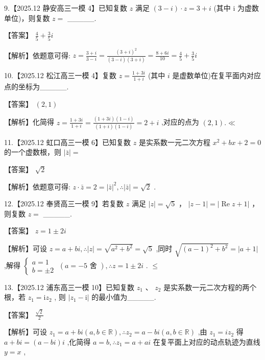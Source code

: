 \documentclass[10pt]{article}
\begin{document}
9.【2025.12 静安高三一模 4】已知复数 \(z\) 满足 \(\left( {3 - i}\right)  \cdot  z = 3 + i\) (其中 \(\mathrm{i}\) 为虚数单位)，则复数 \(z =\) \_\_\_\_\_.

【答案】 \(\frac{4}{5} + \frac{3}{5}i\)

【解析】依题意可得: \(z = \frac{3 + i}{3 - i} = \frac{{\left( 3 + i\right) }^{2}}{\left( {3 - i}\right) \left( {3 + i}\right) } = \frac{8 + {6i}}{10} = \frac{4}{5} + \frac{3}{5}i\)

10.【2025.12 松江高三一模 4】复数 \(z = \frac{1 + {3i}}{1 + i}\) (其中 \(i\) 是虚数单位)在复平面内对应点的坐标为\_\_\_\_\_.

【答案】 \(\left( {2,1}\right)\)

【解析】化简得 \(z = \frac{1 + {3i}}{1 + i} = \frac{\left( {1 + {3i}}\right) \left( {1 - i}\right) }{\left( {1 + i}\right) \left( {1 - i}\right) } = 2 + i\) ,对应的点为 \(\left( {2,1}\right) . \ll\)

11.【2025.12 虹口高三一模 6】已知复数 \(z\) 是实系数一元二次方程 \({x}^{2} + {bx} + 2 = 0\) 的一个虚数根，则 \(\left| \bar{z}\right|  =\)

【答案】 \(\sqrt{2}\)

【解析】依题意可得: \(z \cdot  \bar{z} = 2 = {\left| \bar{z}\right| }^{2},\therefore \left| \bar{z}\right|  = \sqrt{2}\) .

12.【2025.12 奉贤高三一模 9】若复数 \(z\) 满足 \(\left| z\right|  = \sqrt{5}\) ， \(\left| {z - 1}\right|  = \left| {\operatorname{Re}z + 1}\right|\) ，则复数 \(z =\) \_\_\_\_\_.

【答案】 \(z = 1 \pm  {2i}\)

【解析】可设 \(z = a + {bi},\therefore \left| z\right|  = \sqrt{{a}^{2} + {b}^{2}} = \sqrt{5}\) ,同时 \(\sqrt{{\left( a - 1\right) }^{2} + {b}^{2}} = \left| {a + 1}\right|\) ,解得 \(\left\{  \begin{array}{l} a = 1 \\  b =  \pm  2 \end{array}\right. \; \left( {a =  - 5\text{ 舍 }}\right) ,\therefore z = 1 \pm  {2i}\) . \(\leq\)

13.【2025.12 浦东高三一模 10】已知复数 \({z}_{1}\text{ 、 }{z}_{2}\) 是实系数一元二次方程的两个根，若 \({z}_{1} = \mathrm{i}{z}_{2}\) , 则 \(\left| {{z}_{1} - \mathrm{i}}\right|\) 的最小值为\_\_\_\_\_.

【答案】 \(\frac{\sqrt{2}}{2}\)

【解析】可设 \({z}_{1} = a + {bi}\left( {a,b \in  \mathbb{R}}\right) ,\therefore {z}_{2} = a - {bi}\left( {a,b \in  \mathbb{R}}\right)\) ,由 \({z}_{1} = i{z}_{2}\) 得 \(a + {bi} = \left( {a - {bi}}\right) i\) ,化简得 \(a = b,\therefore {z}_{1} = a + {ai}\) 在复平面上对应的动点轨迹为直线 \(y = x\) ,
\end{document}
